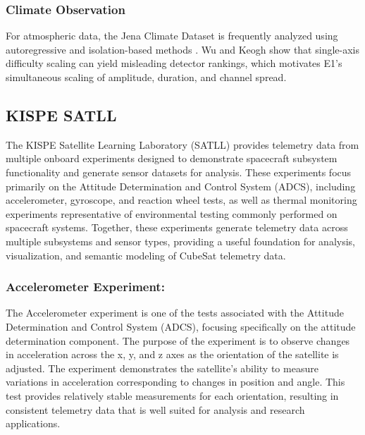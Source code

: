 \documentclass[conference]{IEEEtran}
\newcommand\Logan[1]{\leavevmode{\footnotesize\textbf{[Logan: #1]}}}
\begin{document}
\subsubsection{Climate Observation}

For atmospheric data, the Jena Climate Dataset \cite{jena_climate} is frequently analyzed using autoregressive and isolation-based methods \cite{martinez2020climate}. Wu and Keogh \cite{wu2022benchmarks} show that single-axis difficulty scaling can yield misleading detector rankings, which motivates E1's simultaneous scaling of amplitude, duration, and channel spread. \Logan{Expand}

\subsection{KISPE SATLL}

The KISPE Satellite Learning Laboratory (SATLL) provides telemetry data from multiple onboard experiments designed to demonstrate spacecraft subsystem functionality and generate sensor datasets for analysis. These experiments focus primarily on the Attitude Determination and Control System (ADCS), including accelerometer, gyroscope, and reaction wheel tests, as well as thermal monitoring experiments representative of environmental testing commonly performed on spacecraft systems. Together, these experiments generate telemetry data across multiple subsystems and sensor types, providing a useful foundation for analysis, visualization, and semantic modeling of CubeSat telemetry data.


\subsubsection{Accelerometer Experiment:}
The Accelerometer experiment is one of the tests associated with the Attitude Determination and Control System (ADCS), focusing specifically on the attitude determination component. The purpose of the experiment is to observe changes in acceleration across the x, y, and z axes as the orientation of the satellite is adjusted. The experiment demonstrates the satellite’s ability to measure variations in acceleration corresponding to changes in position and angle. This test provides relatively stable measurements for each orientation, resulting in consistent telemetry data that is well suited for analysis and research applications.
\end{document}
